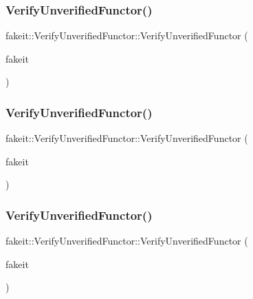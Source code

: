 \subsubsection{\texorpdfstring{VerifyUnverifiedFunctor()}{VerifyUnverifiedFunctor()}\hspace{0.1cm}{\footnotesize\ttfamily [4/9]}}
{\footnotesize\ttfamily fakeit\+::\+Verify\+Unverified\+Functor\+::\+Verify\+Unverified\+Functor (\begin{DoxyParamCaption}\item[{\mbox{\hyperlink{structfakeit_1_1FakeitContext}{Fakeit\+Context}} \&}]{fakeit }\end{DoxyParamCaption})\hspace{0.3cm}{\ttfamily [inline]}}

\mbox{\label{classfakeit_1_1VerifyUnverifiedFunctor_adb55c8a4cdd929e88557f94d0b4fdf1e}} 
\subsubsection{\texorpdfstring{VerifyUnverifiedFunctor()}{VerifyUnverifiedFunctor()}\hspace{0.1cm}{\footnotesize\ttfamily [5/9]}}
{\footnotesize\ttfamily fakeit\+::\+Verify\+Unverified\+Functor\+::\+Verify\+Unverified\+Functor (\begin{DoxyParamCaption}\item[{\mbox{\hyperlink{structfakeit_1_1FakeitContext}{Fakeit\+Context}} \&}]{fakeit }\end{DoxyParamCaption})\hspace{0.3cm}{\ttfamily [inline]}}

\mbox{\label{classfakeit_1_1VerifyUnverifiedFunctor_adb55c8a4cdd929e88557f94d0b4fdf1e}} 
\subsubsection{\texorpdfstring{VerifyUnverifiedFunctor()}{VerifyUnverifiedFunctor()}\hspace{0.1cm}{\footnotesize\ttfamily [6/9]}}
{\footnotesize\ttfamily fakeit\+::\+Verify\+Unverified\+Functor\+::\+Verify\+Unverified\+Functor (\begin{DoxyParamCaption}\item[{\mbox{\hyperlink{structfakeit_1_1FakeitContext}{Fakeit\+Context}} \&}]{fakeit }\end{DoxyParamCaption})\hspace{0.3cm}{\ttfamily [inline]}}

